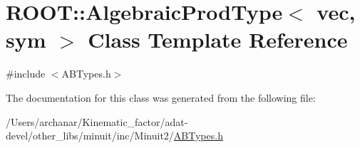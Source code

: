 \hypertarget{classROOT_1_1Minuit2_1_1AlgebraicProdType_3_01vec_00_01sym_01_4}{}\section{R\+O\+OT\+:\+:Algebraic\+Prod\+Type$<$ vec, sym $>$ Class Template Reference}
\label{classROOT_1_1Minuit2_1_1AlgebraicProdType_3_01vec_00_01sym_01_4}


{\ttfamily \#include $<$A\+B\+Types.\+h$>$}



The documentation for this class was generated from the following file\+:\begin{DoxyCompactItemize}
\item 
/\+Users/archanar/\+Kinematic\+\_\+factor/adat-\/devel/other\+\_\+libs/minuit/inc/\+Minuit2/\mbox{\hyperlink{adat-devel_2other__libs_2minuit_2inc_2Minuit2_2ABTypes_8h}{A\+B\+Types.\+h}}\end{DoxyCompactItemize}
